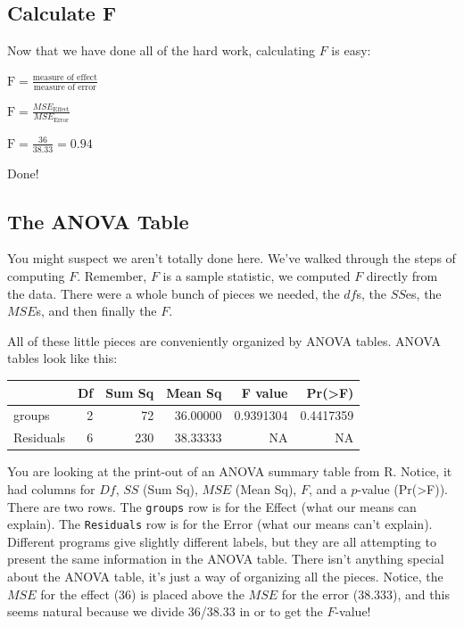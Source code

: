 \documentclass[
]{book}
\begin{document}
\subsection{Calculate F}\label{calculate-f}

Now that we have done all of the hard work, calculating \(F\) is easy:

\(\text{F} = \frac{\text{measure of effect}}{\text{measure of error}}\)

\(\text{F} = \frac{MSE_\text{Effect}}{MSE_\text{Error}}\)

\(\text{F} = \frac{36}{38.33} = 0.94\)

Done!

\subsection{The ANOVA Table}\label{the-anova-table}

You might suspect we aren't totally done here. We've walked through the steps of computing \(F\). Remember, \(F\) is a sample statistic, we computed \(F\) directly from the data. There were a whole bunch of pieces we needed, the \(df\)s, the \(SS\)es, the \(MSE\)s, and then finally the \(F\).

All of these little pieces are conveniently organized by ANOVA tables. ANOVA tables look like this:

\begin{tabular}{l|r|r|r|r|r}
\hline
  & Df & Sum Sq & Mean Sq & F value & Pr(>F)\\
\hline
groups & 2 & 72 & 36.00000 & 0.9391304 & 0.4417359\\
\hline
Residuals & 6 & 230 & 38.33333 & NA & NA\\
\hline
\end{tabular}

You are looking at the print-out of an ANOVA summary table from R. Notice, it had columns for \(Df\), \(SS\) (Sum Sq), \(MSE\) (Mean Sq), \(F\), and a \(p\)-value (Pr(\textgreater F)). There are two rows. The \texttt{groups} row is for the Effect (what our means can explain). The \texttt{Residuals} row is for the Error (what our means can't explain). Different programs give slightly different labels, but they are all attempting to present the same information in the ANOVA table. There isn't anything special about the ANOVA table, it's just a way of organizing all the pieces. Notice, the \(MSE\) for the effect (36) is placed above the \(MSE\) for the error (38.333), and this seems natural because we divide 36/38.33 in or to get the \(F\)-value!
\end{document}
